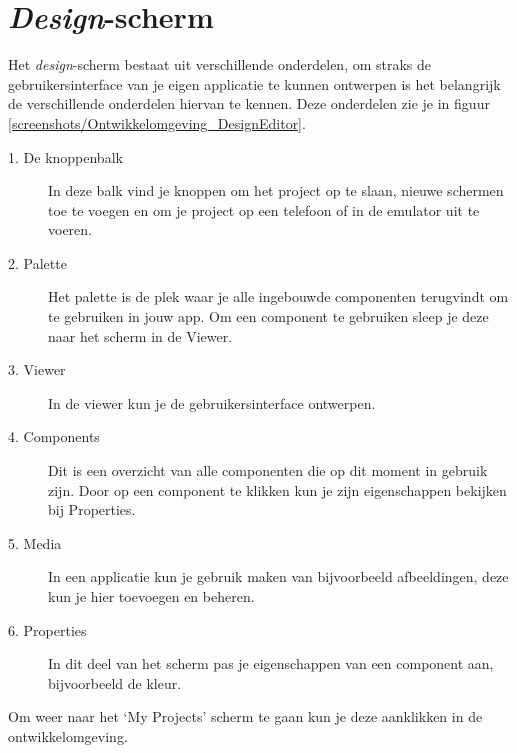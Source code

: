 \section{\emph{Design}-scherm}
\label{sec:design-scherm}
Het  \emph{design}-scherm bestaat uit verschillende onderdelen, om straks de gebruikersinterface van je eigen applicatie te kunnen ontwerpen is het belangrijk de verschillende onderdelen hiervan te kennen. Deze onderdelen zie je in figuur \ref{screenshots/Ontwikkelomgeving_DesignEditor}.


\begin{description}
  \item[1. De knoppenbalk] In deze balk vind je knoppen om het project op te slaan, nieuwe schermen toe te voegen en om je project op een telefoon of in de emulator uit te voeren.
  \item[2. Palette] Het palette is de plek waar je alle ingebouwde componenten terugvindt om te gebruiken in jouw app. Om een component te gebruiken sleep je deze naar het scherm in de Viewer.
  \item[3. Viewer] In de viewer kun je de gebruikersinterface ontwerpen. 
  \item[4. Components] Dit is een overzicht van alle componenten die op dit moment in gebruik zijn. Door op een component te klikken kun je zijn eigenschappen bekijken bij Properties.
  \item[5. Media] In een applicatie kun je gebruik maken van bijvoorbeeld afbeeldingen, deze kun je hier toevoegen en beheren.
  \item[6. Properties] In dit deel van het scherm pas je eigenschappen van een component aan, bijvoorbeeld de kleur.
\end{description}

Om weer naar het `My Projects' scherm te gaan kun je deze aanklikken in de ontwikkelomgeving.
